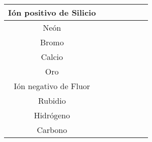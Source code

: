 \begin{tabular}{|c|c|c|c|c|c|c|}
    Ión positivo de Silicio &         &          &           &            &              &                \\    \hline
    Neón                    &         &          &           &            &              &                \\    \hline
    Bromo                   &         &          &           &            &              &                \\    \hline
    Calcio                  &         &          &           &            &              &                \\    \hline
    Oro                     &         &          &           &            &              &                \\    \hline
    Ión negativo de Fluor   &         &          &           &            &              &                \\    \hline
    Rubidio                 &         &          &           &            &              &                \\    \hline
    Hidrógeno               &         &          &           &            &              &                \\    \hline
    Carbono                 &         &          &           &            &              &                \\    \hline
\end{tabular}